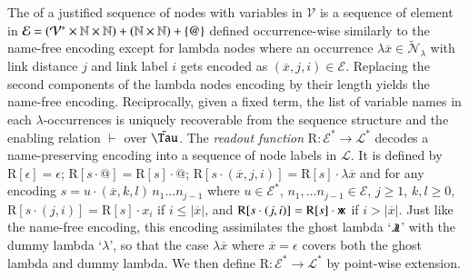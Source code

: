 \documentclass{elsarticle}
\theoremstyle{plain}
\theoremstyle{definition}
\newcommand\VarSet{\mathcal{V}}
\newcommand\Nodes{\mathcal{N}}%
\newcommand{\ghostlmd}{{\lambda\mkern-7mu \lambda}}
\newcommand{\ghostvar}{\mathsf{x\mkern-5mu x}}
\newcommand\ExtendedNodesLmd{\tilde{\Nodes}_{\lambda}}
\def\readout{\mathrm{R}} %
\def\nameencoding{\mathcal{E}} %
\newcommand{\enables}{\vdash} %
\newcommand{\exttree}{\tilde{\Tau}} %
\begin{document}
The  of a justified sequence of nodes with variables in $\VarSet$ is a sequence of element in
$\nameencoding = (\mathcal{V}^*\times\nat\times\nat) +
   (\nat\times\nat)
   + \{ @ \}$  defined occurrence-wise similarly to the name-free encoding
 except for lambda nodes where
  an occurrence $\lambda\overline{x}\in\ExtendedNodesLmd$
 with link distance $j$ and link label $i$ gets encoded
 as $(\overline{x},j,i) \in \mathcal{E}$.
%
Replacing the second components of the lambda nodes encoding by their length
yields the name-free encoding.
Reciprocally, given a fixed term, the list of variable names in each $\lambda$-occurrences is uniquely recoverable from the sequence structure and the enabling relation $\enables$ over $\exttree$.
%
%
The \emph{readout function} $\readout: \nameencoding^* \rightarrow \mathcal{L}^*$
decodes a name-preserving encoding into a sequence of node labels in $\mathcal{L}$. It is defined by
$\readout[\epsilon]= \epsilon$;
$\readout[s \cdot @] = \readout[s] \cdot @$;
$\readout[s \cdot (\overline{x}, j, i) ] = \readout[s] \cdot \lambda\overline{x}$
and for any encoding $s = u \cdot (\overline{x}, k, l)\,  n_1 \ldots n_{j-1}$ where $u \in \nameencoding^*$, $n_1, \ldots n_{j-1}\in \nameencoding$, $j\geq 1$, $k,l\geq 0$,
$\readout[s\cdot (j,i)] = \readout[s] \cdot x_i$
if $i\leq |\overline{x}|$, and
$\readout[s\cdot (j,i)]  = \readout[s] \cdot \ghostvar$ if $i> |\overline{x}|$.
Just like the name-free encoding, this encoding assimilates the ghost lambda `$\ghostlmd$' with the dummy lambda `$\lambda$', so that the case $\lambda\overline{x}$ where $\overline{x}=\epsilon$ covers both the ghost lambda and dummy lambda.
%
We then define $\readout \colon \nameencoding^* \rightarrow \mathcal{L}^*$
by point-wise extension.
\end{document}
